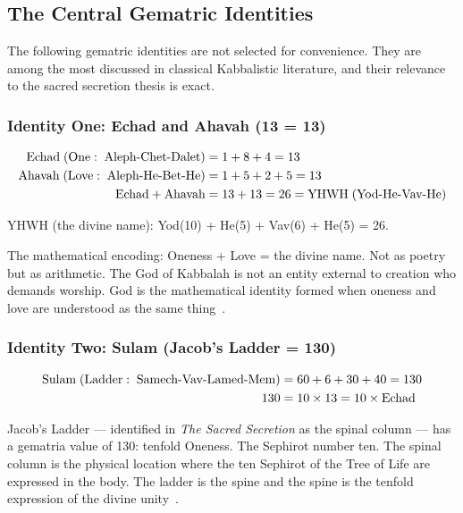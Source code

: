 \documentclass[12pt, a4paper]{article}
\begin{document}
\subsection{The Central Gematric Identities}

The following gematric identities are not selected for convenience. They are
among the most discussed in classical Kabbalistic literature, and their
relevance to the sacred secretion thesis is exact.

\subsubsection{Identity One: Echad and Ahavah (13 = 13)}

\begin{align}
\text{Echad} \; (\text{One}: \;\text{Aleph-Chet-Dalet}) &= 1 + 8 + 4 = 13 \notag \\
\text{Ahavah} \; (\text{Love}: \;\text{Aleph-He-Bet-He}) &= 1 + 5 + 2 + 5 = 13 \notag \\
\text{Echad} + \text{Ahavah} &= 13 + 13 = 26 = \text{YHWH} \; (\text{Yod-He-Vav-He}) \notag
\end{align}

YHWH (the divine name): Yod(10) + He(5) + Vav(6) + He(5) = 26.

The mathematical encoding: Oneness + Love = the divine name. Not as poetry
but as arithmetic. The God of Kabbalah is not an entity external to creation
who demands worship. God is the mathematical identity formed when oneness and
love are understood as the same thing~\autocite{blumenthal2006}.

\subsubsection{Identity Two: Sulam (Jacob's Ladder = 130)}

\begin{align}
\text{Sulam} \; (\text{Ladder}: \;\text{Samech-Vav-Lamed-Mem}) &= 60 + 6 + 30 + 40 = 130 \notag \\
130 &= 10 \times 13 = 10 \times \text{Echad} \notag
\end{align}

Jacob's Ladder — identified in \emph{The Sacred Secretion} as the spinal
column — has a gematria value of 130: tenfold Oneness. The Sephirot number
ten. The spinal column is the physical location where the ten Sephirot of the
Tree of Life are expressed in the body. The ladder is the spine and the spine
is the tenfold expression of the divine unity~\autocite{scholem1974}.
\end{document}
